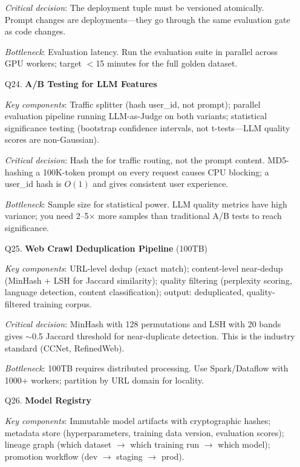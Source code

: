 \begin{enumerate}[leftmargin=*]
    \textit{Critical decision}: The deployment tuple  must be versioned atomically. Prompt changes are deployments---they go through the same evaluation gate as code changes.

    \textit{Bottleneck}: Evaluation latency. Run the evaluation suite in parallel across GPU workers; target $<$15 minutes for the full golden dataset.

    \item[Q24.] \textbf{A/B Testing for LLM Features}

    \textit{Key components}: Traffic splitter (hash user\_id, not prompt); parallel evaluation pipeline running LLM-as-Judge on both variants; statistical significance testing (bootstrap confidence intervals, not t-tests---LLM quality scores are non-Gaussian).

    \textit{Critical decision}: Hash the  for traffic routing, not the prompt content. MD5-hashing a 100K-token prompt on every request causes CPU blocking; a user\_id hash is $O(1)$ and gives consistent user experience.

    \textit{Bottleneck}: Sample size for statistical power. LLM quality metrics have high variance; you need 2--5$\times$ more samples than traditional A/B tests to reach significance.

    \item[Q25.] \textbf{Web Crawl Deduplication Pipeline} (100TB)

    \textit{Key components}: URL-level dedup (exact match); content-level near-dedup (MinHash + LSH for Jaccard similarity); quality filtering (perplexity scoring, language detection, content classification); output: deduplicated, quality-filtered training corpus.

    \textit{Critical decision}: MinHash with 128 permutations and LSH with 20 bands gives $\sim$0.5 Jaccard threshold for near-duplicate detection. This is the industry standard (CCNet, RefinedWeb).

    \textit{Bottleneck}: 100TB requires distributed processing. Use Spark/Dataflow with 1000+ workers; partition by URL domain for locality.

    \item[Q26.] \textbf{Model Registry}

    \textit{Key components}: Immutable model artifacts with cryptographic hashes; metadata store (hyperparameters, training data version, evaluation scores); lineage graph (which dataset $\to$ which training run $\to$ which model); promotion workflow (dev $\to$ staging $\to$ prod).


\end{enumerate}
